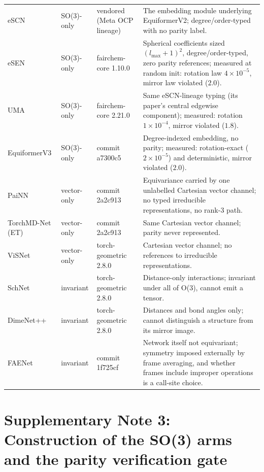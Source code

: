 \begin{table}[htbp]
\begin{tabular}{@{}>{\raggedright\arraybackslash}p{2.2cm} l >{\raggedright\arraybackslash}p{1.9cm} >{\raggedright\arraybackslash}p{6.0cm}@{}}
eSCN & SO(3)-only & vendored (Meta OCP lineage) & The embedding module underlying EquiformerV2; degree/order-typed with no parity label. \\
eSEN\cite{fu2025esen} & SO(3)-only & fairchem-core 1.10.0 & Spherical coefficients sized $(l_{\max}+1)^2$, degree/order-typed, zero parity references; measured at random init: rotation law $4\times10^{-5}$, mirror law violated ($2.0$). \\
UMA\cite{wood2025uma} & SO(3)-only & fairchem-core 2.21.0 & Same eSCN-lineage typing (its paper's central edgewise component); measured: rotation $1\times10^{-4}$, mirror violated ($1.8$). \\
EquiformerV3\cite{equiformerv3} & SO(3)-only & commit a7300c5 & Degree-indexed embedding, no parity; measured: rotation-exact ($2\times10^{-5}$) and deterministic, mirror violated ($2.0$). \\
\midrule
PaiNN\cite{schutt2021painn} & vector-only & commit 2a2c913 & Equivariance carried by one unlabelled Cartesian vector channel; no typed irreducible representations, no rank-3 path. \\
TorchMD-Net (ET)\cite{tholke2022torchmdnet} & vector-only & commit 2a2c913 & Same Cartesian vector channel; parity never represented. \\
ViSNet\cite{wang2024visnet} & vector-only & torch-geometric 2.8.0 & Cartesian vector channel; no references to irreducible representations. \\
\midrule
SchNet\cite{schutt2017schnet} & invariant & torch-geometric 2.8.0 & Distance-only interactions; invariant under all of O(3), cannot emit a tensor. \\
DimeNet++\cite{gasteiger2020dimenetpp} & invariant & torch-geometric 2.8.0 & Distances and bond angles only; cannot distinguish a structure from its mirror image. \\
FAENet\cite{duval2023faenet} & invariant & commit 1f725cf & Network itself not equivariant; symmetry imposed externally by frame averaging, and whether frames include improper operations is a call-site choice. \\
\bottomrule
\end{tabular}

\end{table}

\section*{Supplementary Note 3: Construction of the SO(3) arms and the parity verification gate}

